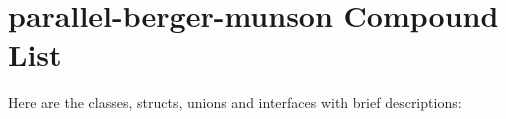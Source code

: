 \section{parallel-berger-munson Compound List}
Here are the classes, structs, unions and interfaces with brief descriptions:\begin{CompactList}
\item{}
\item{}
\item{}
\end{CompactList}
